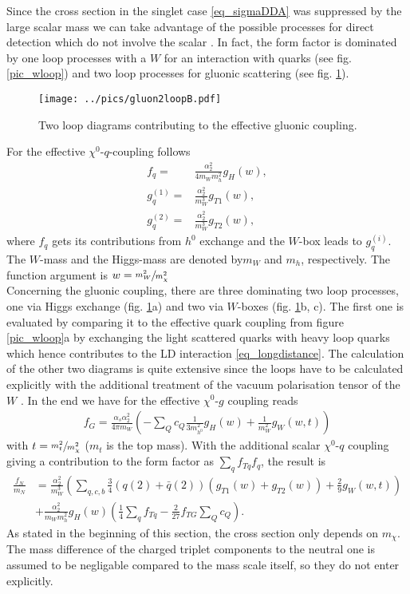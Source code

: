 Since the cross section in the singlet case \eqref{eq_sigmaDDA} was suppressed by the large scalar mass we can take advantage of the possible 
processes for direct detection which do not involve the scalar \cite{1004.4090}. In fact, the form factor is dominated by one loop processes with a 
$W$ for an interaction with quarks (see fig. \ref{pic_wloop}) and two loop processes for gluonic scattering (see fig. \ref{pic_2loopgluon}).
\begin{figure}[t]
 \texttt{[image: ../pics/gluon2loopB.pdf]}
 \caption{Two loop diagrams contributing to the effective gluonic coupling.}
 \label{pic_2loopgluon}
\end{figure}
For the effective $\chi^0$-$q$-coupling follows
\begin{align}
 f_q =& \frac{\alpha_2^2}{4m_W m_{h}^2} g_H(w),\\
 g^{(1)}_q =& \frac{\alpha_2^2}{m_W^3}g_{T1}(w),\\
 g^{(2)}_q =&\frac{\alpha_2^2}{m_W^3}g_{T2}(w), 
\end{align}
where $f_q$ gets its contributions from $h^0$ exchange and the $W$-box leads to $g^{(i)}_q$. The $W$-mass and the Higgs-mass are denoted by$m_W$ and 
$m_h$, respectively. The function argument is $w=\sfrac{m_W^2}{m_\chi^2}$ \\
\noindent Concerning the gluonic coupling, there are three dominating two loop processes, one via Higgs exchange (fig. \ref{pic_2loopgluon}a) and two
via $W$-boxes (fig. \ref{pic_2loopgluon}b, c). The first one is evaluated by comparing it to the effective quark coupling from figure \ref{pic_wloop}a
by exchanging the light scattered quarks with heavy loop quarks which hence contributes to the LD interaction \eqref{eq_longdistance}. 
The calculation of the other two diagrams is quite extensive since the loops have to be calculated explicitly with the additional treatment of the vacuum 
polarisation tensor of the $W$ \cite{1007.2601}. In the end we have for the effective $\chi^0$-$g$ coupling reads
\begin{align}
 f_G = \frac{\alpha_s\alpha_2^2}{4\pi m_W}\left(-\sum\limits_Q c_Q \frac{1}{3m_{h^0}^2} g_H(w) + \frac{1}{m_W^2} g_{W}(w,t) \right)
\end{align}
with $t=\sfrac{m_t^2}{m_\chi^2}$ ($m_t$ is the top mass).
With the additional scalar $\chi^0$-$q$ coupling giving a contribution to the form factor as $\sum_qf_{Tq}f_q$, the result is
\begin{align}
 \frac{f_N}{m_N} &= \frac{\alpha_2^2}{m_W^3}\left(\sum\limits_{q,c,b} \frac34 \left(q(2)+\bar q(2)\right) \left(g_{T1}(w) + g_{T2}(w)\right) + \frac29g_W(w,t)\right) \\
 \nonumber
 &+ \frac{\alpha_2^2}{m_W m_h^2}g_H(w) \left(\frac14 \sum\limits_q f_{Tq} - \frac{2}{27}f_{TG}\sum\limits_Q c_Q \right).
\end{align}
As stated in the beginning of this section, the cross section only depends
on $m_\chi$. The mass difference of the charged triplet components to the neutral one is assumed to be negligable compared to the mass scale itself,
so they do not enter explicitly. 

